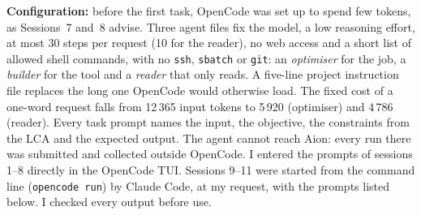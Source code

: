 \documentclass[conference,a4paper]{IEEEtran}
\begin{document}
\textbf{Configuration:} before the first task, OpenCode was set up to spend
few tokens, as Sessions~7 and~8 advise. Three agent files fix the model, a low
reasoning effort, at most 30 steps per request (10 for the reader), no web
access and a short list of allowed shell commands, with no \texttt{ssh},
\texttt{sbatch} or \texttt{git}: an \emph{optimiser} for the job, a
\emph{builder} for the tool and a \emph{reader} that only reads. A five-line
project instruction file replaces the long one OpenCode would otherwise load.
The fixed cost of a one-word request falls from 12\,365 input tokens to 5\,920
(optimiser) and 4\,786 (reader). Every task prompt names the input, the
objective, the constraints from the LCA and the expected output. The agent
cannot reach Aion: every run there was submitted and collected outside
OpenCode. I entered the prompts of sessions 1--8 directly in the OpenCode TUI.
Sessions 9--11 were started from the command line (\texttt{opencode run}) by
Claude Code, at my request, with the prompts listed below. I checked every
output before use.
\end{document}
